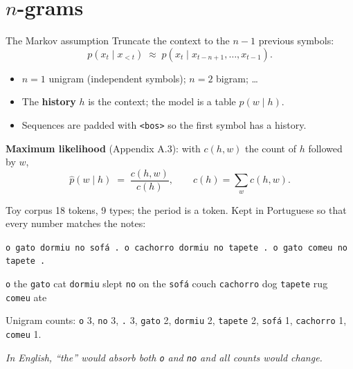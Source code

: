 \documentclass[11pt,aspectratio=169]{beamer}
\newcommand{\dest}[1]{\textcolor{structure}{\textbf{#1}}}
\newcommand{\hook}[1]{{\small\textcolor{gray!60!black}{\textit{#1}}}}
\newcommand{\bos}{\texttt{<bos>}}
\begin{document}
\section{$n$-grams}

\begin{frame}{The Markov assumption}
  Truncate the context to the $n-1$ previous symbols:
  \[
    p(x_t\mid x_{<t}) \;\approx\; p(x_t\mid x_{t-n+1},\dots,x_{t-1}).
  \]

  \vspace{0.6em}
  \begin{itemize}
    \item $n=1$ unigram (independent symbols); $n=2$ bigram; \dots
    \item The \dest{history} $h$ is the context; the model is a table $p(w\mid h)$.
    \item Sequences are padded with \bos{} so the first symbol has a history.
  \end{itemize}

  \vspace{0.8em}
  \textbf{Maximum likelihood} (Appendix A.3): with $c(h,w)$ the count of $h$ followed by $w$,
  \[
    \hat p(w\mid h) \;=\; \frac{c(h,w)}{c(h)}, \qquad c(h) = \sum_w c(h,w).
  \]
\end{frame}

\begin{frame}{Toy corpus}
  18 tokens, 9 types; the period is a token. Kept in Portuguese so that every number
  matches the notes:

  \begin{center}
    \texttt{o gato dormiu no sofá . o cachorro dormiu no tapete . o gato comeu no tapete .}
  \end{center}

  \vspace{0.4em}
  \texttt{o} the \textperiodcentered{} \texttt{gato} cat \textperiodcentered{} \texttt{dormiu}
  slept \textperiodcentered{} \texttt{no} on the \textperiodcentered{} \texttt{sofá} couch
  \textperiodcentered{} \texttt{cachorro} dog \textperiodcentered{} \texttt{tapete} rug
  \textperiodcentered{} \texttt{comeu} ate

  \vspace{0.8em}
  Unigram counts: \texttt{o} 3, \texttt{no} 3, \texttt{.} 3, \texttt{gato} 2, \texttt{dormiu}
  2, \texttt{tapete} 2, \texttt{sofá} 1, \texttt{cachorro} 1, \texttt{comeu} 1.

  \vspace{0.6em}
  \hook{In English, ``the'' would absorb both \texttt{o} and \texttt{no} and all counts
  would change.}
\end{frame}
\end{document}
